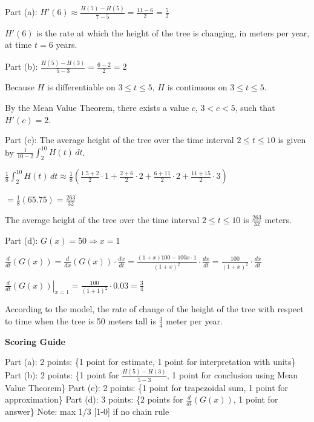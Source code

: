 \documentclass[12pt,addpoints,answers]{exam}
\begin{document}
\begin{questions}
\begin{solution}
Part (a): $H'(6) \approx \frac{H(7) - H(5)}{7 - 5} = \frac{11 - 6}{2} = \frac{5}{2}$ \par $H'(6)$ is the rate at which the height of the tree is changing, in meters per year, at time $t = 6$ years. \par Part (b): $\frac{H(5) - H(3)}{5 - 3} = \frac{6 - 2}{2} = 2$ \par Because $H$ is differentiable on $3 \le t \le 5$, $H$ is continuous on $3 \le t \le 5$. \par By the Mean Value Theorem, there exists a value $c$, $3 < c < 5$, such that $H'(c) = 2$. \par Part (c): The average height of the tree over the time interval $2 \le t \le 10$ is given by $\frac{1}{10 - 2}\int_2^{10} H(t)\,dt$. \par $\frac{1}{8}\int_2^{10} H(t)\,dt \approx \frac{1}{8}\left(\frac{1.5 + 2}{2} \cdot 1 + \frac{2 + 6}{2} \cdot 2 + \frac{6 + 11}{2} \cdot 2 + \frac{11 + 15}{2} \cdot 3\right)$ \par $= \frac{1}{8}(65.75) = \frac{263}{32}$ \par The average height of the tree over the time interval $2 \le t \le 10$ is $\frac{263}{32}$ meters. \par Part (d): $G(x) = 50 \Rightarrow x = 1$ \par $\frac{d}{dt}(G(x)) = \frac{d}{dx}(G(x)) \cdot \frac{dx}{dt} = \frac{(1 + x)100 - 100x \cdot 1}{(1 + x)^2} \cdot \frac{dx}{dt} = \frac{100}{(1 + x)^2} \cdot \frac{dx}{dt}$ \par $\left.\frac{d}{dt}(G(x))\right|_{x=1} = \frac{100}{(1+1)^2} \cdot 0.03 = \frac{3}{4}$ \par According to the model, the rate of change of the height of the tree with respect to time when the tree is 50 meters tall is $\frac{3}{4}$ meter per year.
\par\medskip
\textbf{Scoring Guide}\par
Part (a): 2 points: \{1 point for estimate, 1 point for interpretation with units\} Part (b): 2 points: \{1 point for $\frac{H(5) - H(3)}{5 - 3}$, 1 point for conclusion using Mean Value Theorem\} Part (c): 2 points: \{1 point for trapezoidal sum, 1 point for approximation\} Part (d): 3 points: \{2 points for $\frac{d}{dt}(G(x))$, 1 point for answer\} Note: max 1/3 [1-0] if no chain rule
\end{solution}


\end{questions}
\end{document}
